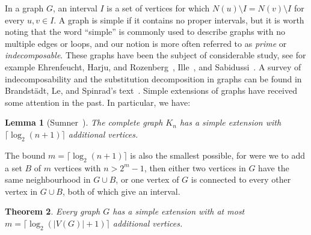 \documentclass[11pt]{article}
\newtheorem{theorem}{Theorem}[section]
\newtheorem{lemma}[theorem]{Lemma}
\begin{document}
In a graph $G$, an interval $I$ is a set of vertices for which
$N(u)\setminus I = N(v)\setminus I$ for every $u,v\in I$. A graph is
simple if it contains no proper intervals, but it is worth noting
that the word ``simple'' is commonly used to describe graphs with no multiple edges or loops, and our
notion is more often referred to as \emph{prime} or
\emph{indecomposable}. These graphs have been the subject of considerable study, see for example Ehrenfeucht, Harju, and Rozenberg~\cite{ehrenfeucht:the-theory-of-2:}, Ille~\cite{ille:indecomposable-:}, and Sabidussi~\cite{sabidussi:graph-derivativ:}. A survey of indecomposability and the substitution decomposition in graphs can be found in Brandst{\"a}dt, Le, and Spinrad's text~\cite{brandstadt:graph-classes:-:}. Simple extensions of graphs have received some attention in the past. In particular, we have:

\begin{lemma}[Sumner~{\cite[Theorem 2.45]{sumner:indecomposable-:}}]\label{completegraph}
The complete graph $K_n$ has a simple extension with $\lceil\log_2(n+1)\rceil$
additional vertices.
\end{lemma}

The bound $m=\lceil\log_2(n+1)\rceil$ is also the smallest
possible, for were we to add a set $B$ of $m$ vertices with $n>2^m-1$, then either two vertices in $G$ have the same neighbourhood in $G\cup B$, or one vertex of $G$ is connected to
every other vertex in $G\cup B$, both of which give an interval.

\begin{theorem}\label{thm-graphs}
Every graph $G$ has a simple extension with at most
$m=\lceil\log_2(|V(G)|+1)\rceil$ additional vertices.
\end{theorem}
\end{document}
